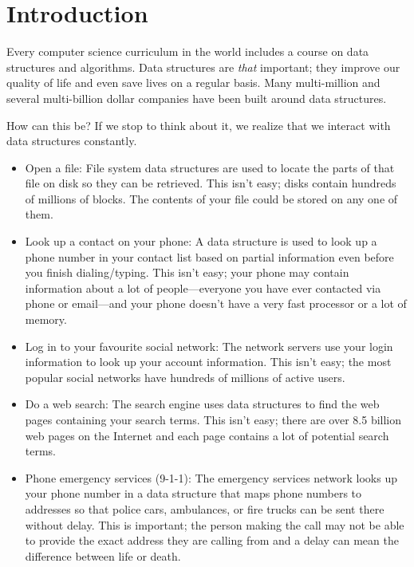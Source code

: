 \documentclass[10pt]{book}
\newcommand{\fancyhead}[2][zzz]{}
\theoremstyle{plain}
\theoremstyle{definition}
\begin{document}
\fancyhead[CE]{\small\nouppercase{\leftmark}} %
\fancyhead[CO]{\small\rightmarktitle} %
\fancyhead[RO,LE]{\small\rightmarksection}

\clearpage
\chapter{Introduction}

Every computer science curriculum in the world includes a course on data
structures and algorithms.  Data structures are \emph{that} important;
they improve our quality of life and even save lives on a regular basis.
Many multi-million and several multi-billion dollar companies have been
built around data structures.

How can this be?  If we stop to think about it, we realize that we
interact with data structures constantly.
\begin{itemize}
  \item  Open a file: File system 
    data structures are used to locate
    the parts of that file on disk so they can be retrieved.  This isn't
    easy; disks contain hundreds of millions of blocks.  The contents of your
    file could be stored on any one of them.
  \item Look up a contact on your phone:  A data
    structure is used to look up a phone number in your contact list
    based on partial
    information even before you finish dialing/typing.  This isn't easy;
    your phone may contain information about a lot of people---everyone
    you have ever contacted via phone or email---and your phone doesn't
    have a very fast processor or a lot of memory.
  \item Log in to your favourite social network:
    The network servers
    use your login information to look up your account information.
    This isn't easy; the most popular social networks have hundreds of
    millions of active users.
  \item Do a web search:
    The search engine uses data structures to find
    the web pages containing your search terms.  This isn't easy; there
    are over 8.5 billion web pages on the Internet and each page contains
    a lot of potential search terms.
  \item Phone emergency services (9-1-1):
    The emergency services network
    looks up your phone number in a data structure that maps phone numbers
    to addresses so that police cars, ambulances, or fire trucks can be
    sent there without delay. This is important;  the person making the
    call may not be able to provide the exact address they are calling
    from and a delay can mean the difference between life or death.
\end{itemize}
\end{document}
